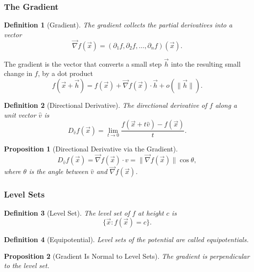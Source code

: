 \documentclass{article}
\newtheorem{definition}{Definition}
\newtheorem{proposition}{Proposition}
\begin{document}
\subsubsection{The Gradient}
\begin{definition}[Gradient]
    The gradient collects the partial derivatives into a vector
    \begin{equation}
        \label{eq:gradient}
        \vec{\nabla} f(\vec{x}) = \left(\partial_1 f,\partial_2 f,\dots,\partial_n f\right)(\vec{x}).
    \end{equation}
\end{definition}
The gradient is the vector that converts a small step $\vec{h}$ into the resulting small change in $f$, by a dot product
\[f(\vec{x}+\vec{h}) = f(\vec{x}) + \vec{\nabla} f(\vec{x})\cdot \vec{h} + o(\|\vec{h}\|).\]
\begin{definition}[Directional Derivative]
    The directional derivative of $f$ along a unit vector $\hat{v}$ is
    \begin{equation}
        \label{eq:directional-derivative}
        D_{\hat{v}}f(\vec{x}) = \lim_{t\to0}\frac{f(\vec{x}+t\hat{v})-f(\vec{x})}{t}.
    \end{equation}
\end{definition}
\begin{proposition}[Directional Derivative via the Gradient]
    \begin{equation}
        \label{eq:directional-gradient}
        D_{\hat{v}}f(\vec{x}) = \vec{\nabla} f(\vec{x})\cdot \hat{v} = \|\vec{\nabla} f(\vec{x})\|\cos\theta,
    \end{equation}
    where $\theta$ is the angle between $\hat{v}$ and $\vec{\nabla} f(\vec{x})$.
\end{proposition}

\subsubsection{Level Sets}
\begin{definition}[Level Set]
    The level set of $f$ at height $c$ is
    \begin{equation}
        \label{eq:level-set}
        \{\vec{x}:f(\vec{x})=c\}.
    \end{equation}
\end{definition}
\begin{definition}[Equipotential]
    Level sets of the potential are called equipotentials.
\end{definition}
\begin{proposition}[Gradient Is Normal to Level Sets]
    The gradient is perpendicular to the level set.
\end{proposition}
\end{document}
